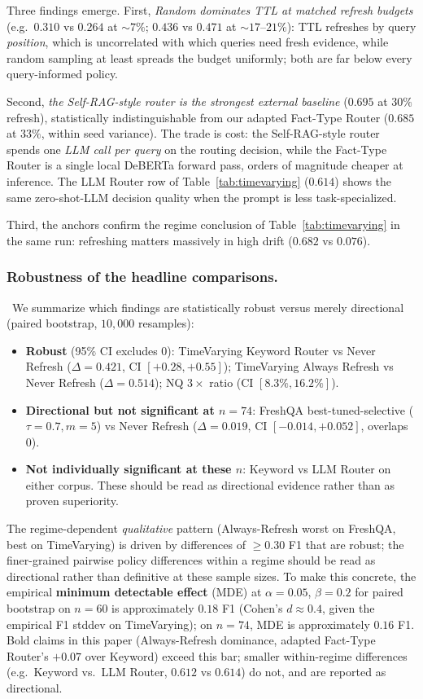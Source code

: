 \documentclass[pdflatex,sn-basic]{sn-jnl}
\begin{document}
Three findings emerge. First, \emph{Random dominates TTL at matched refresh budgets} (e.g.\ $0.310$ vs $0.264$ at ${\sim}7\%$; $0.436$ vs $0.471$ at ${\sim}17$--$21\%$): TTL refreshes by query \emph{position}, which is uncorrelated with which queries need fresh evidence, while random sampling at least spreads the budget uniformly; both are far below every query-informed policy.

Second, \emph{the Self-RAG-style router is the strongest external baseline} ($0.695$ at $30\%$ refresh), statistically indistinguishable from our adapted Fact-Type Router ($0.685$ at $33\%$, within seed variance). The trade is cost: the Self-RAG-style router spends one \emph{LLM call per query} on the routing decision, while the Fact-Type Router is a single local DeBERTa forward pass, orders of magnitude cheaper at inference. The LLM Router row of Table~\ref{tab:timevarying} ($0.614$) shows the same zero-shot-LLM decision quality when the prompt is less task-specialized.

Third, the anchors confirm the regime conclusion of Table~\ref{tab:timevarying} in the same run: refreshing matters massively in high drift ($0.682$ vs $0.076$).

\subsubsection*{Robustness of the headline comparisons.}~We summarize which findings are statistically robust versus merely directional (paired bootstrap, $10{,}000$ resamples):
\begin{itemize}
\item \textbf{Robust} (95\% CI excludes 0): TimeVarying Keyword Router vs Never Refresh ($\Delta{=}0.421$, CI $[+0.28,+0.55]$); TimeVarying Always Refresh vs Never Refresh ($\Delta{=}0.514$); NQ $3{\times}$ ratio (CI $[8.3\%,16.2\%]$).
\item \textbf{Directional but not significant at $n{=}74$}: FreshQA best-tuned-selective ($\tau{=}0.7,m{=}5$) vs Never Refresh ($\Delta{=}0.019$, CI $[-0.014,+0.052]$, overlaps 0).
\item \textbf{Not individually significant at these $n$}: Keyword vs LLM Router on either corpus. These should be read as directional evidence rather than as proven superiority.
\end{itemize}
The regime-dependent \emph{qualitative} pattern (Always-Refresh worst on FreshQA, best on TimeVarying) is driven by differences of $\geq 0.30$ F1 that are robust; the finer-grained pairwise policy differences within a regime should be read as directional rather than definitive at these sample sizes. To make this concrete, the empirical \textbf{minimum detectable effect} (MDE) at $\alpha{=}0.05$, $\beta{=}0.2$ for paired bootstrap on $n{=}60$ is approximately $0.18$ F1 (Cohen's $d{\approx}0.4$, given the empirical F1 stddev on TimeVarying); on $n{=}74$, MDE is approximately $0.16$ F1. Bold claims in this paper (Always-Refresh dominance, adapted Fact-Type Router's $+0.07$ over Keyword) exceed this bar; smaller within-regime differences (e.g.\ Keyword vs.\ LLM Router, $0.612$ vs $0.614$) do not, and are reported as directional.
\end{document}
